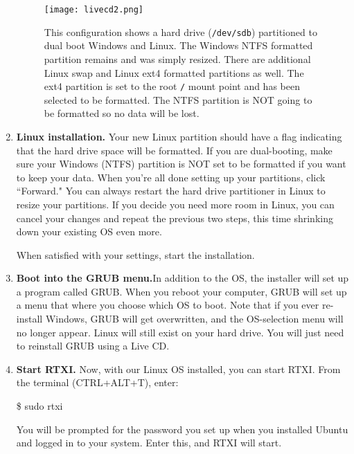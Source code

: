 \begin{enumerate}
\begin{figure}[h]
\begin{center}
\texttt{[image: livecd2.png]} 
\caption[Ubuntu Installation: Dual booting Window and Linux]{This configuration shows a hard drive (\texttt{/dev/sdb}) partitioned to dual boot Windows and Linux. The Windows NTFS formatted partition remains and was simply resized. There are additional Linux swap and Linux ext4 formatted partitions as well. The ext4 partition is set to the root \texttt{/} mount point and has been selected to be formatted. The NTFS partition is NOT going to be formatted so no data will be lost.} \end{center}
\end{figure}

\item \textbf{Linux installation.} Your new Linux partition should have a flag indicating that the hard drive space will be formatted. If you are dual-booting, make sure your Windows (NTFS) partition is NOT set to be formatted if you want to keep your data. When you're all done setting up your partitions, click ``Forward." You can always restart the hard drive partitioner in Linux to resize your partitions. If you decide you need more room in Linux, you can cancel your changes and repeat the previous two steps, this time shrinking down your existing OS even more. 

When satisfied with your settings, start the installation. 

\item \textbf{Boot into the GRUB menu.}In addition to the OS, the installer will set up a program called GRUB. When you reboot your computer, GRUB will set up a menu that where you choose which OS to boot. Note that if you ever re-install Windows, GRUB will get overwritten, and the OS-selection menu will no longer appear. Linux will still exist on your hard drive. You will just need to reinstall GRUB using a Live CD.

\item \textbf{Start RTXI.} Now, with our Linux OS installed, you can start RTXI. From the terminal (CTRL+ALT+T), enter:
\begin{example}
\$ sudo rtxi
\end{example}

You will be prompted for the password you set up when you installed Ubuntu and logged in to your system. Enter this, and RTXI will start. 

\end{enumerate}
